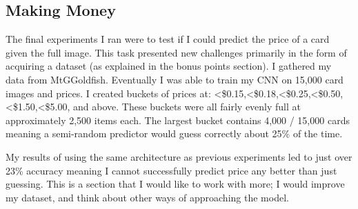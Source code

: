 \subsection{Making Money}
The final experiments I ran were to test if I could predict the 
price of a card given the full image. This task presented new 
challenges primarily in the form of acquiring a dataset (as explained
in the bonus points section). I gathered my data from MtGGoldfish\cite{goldfish}.
Eventually I was able to train my CNN
on 15,000 card images and prices. I created buckets of prices at:
<\$0.15,<\$0.18,<\$0.25,<\$0.50,<\$1.50,<\$5.00, and above. These buckets
were all fairly evenly full at approximately 2,500 items each. The 
largest bucket contains 4,000 / 15,000 cards meaning a semi-random
predictor would guess correctly about 25\% of the time.

My results of using the same architecture as previous experiments led 
to just over 23\% accuracy meaning I cannot successfully predict price
any better than just guessing.   
This is a section that I would like to work with more; I would improve
my dataset, and think about other ways of approaching the model.